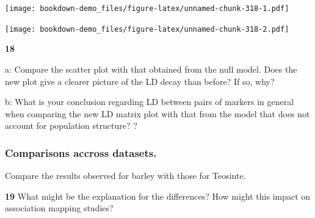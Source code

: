 \documentclass[
]{book}
\makeatletter
\newenvironment{Shaded}{\begin{snugshade}}{\end{snugshade}}
\newcommand{\AttributeTok}[1]{\textcolor[rgb]{0.77,0.63,0.00}{#1}}
\newcommand{\DecValTok}[1]{\textcolor[rgb]{0.00,0.00,0.81}{#1}}
\newcommand{\FloatTok}[1]{\textcolor[rgb]{0.00,0.00,0.81}{#1}}
\newcommand{\FunctionTok}[1]{\textcolor[rgb]{0.00,0.00,0.00}{#1}}
\newcommand{\NormalTok}[1]{#1}
\newcommand{\OtherTok}[1]{\textcolor[rgb]{0.56,0.35,0.01}{#1}}
\newcommand{\SpecialCharTok}[1]{\textcolor[rgb]{0.00,0.00,0.00}{#1}}
\newcommand{\StringTok}[1]{\textcolor[rgb]{0.31,0.60,0.02}{#1}}
\newenvironment{kframe}{%
\medskip{}
\setlength{\fboxsep}{.8em}
 \def\at@end@of@kframe{}%
 \ifinner\ifhmode%
  \def\at@end@of@kframe{\end{minipage}}%
  \begin{minipage}{\columnwidth}%
 \fi\fi%
 \def\FrameCommand##1{\hskip\@totalleftmargin \hskip-\fboxsep
 \colorbox{shadecolor}{##1}\hskip-\fboxsep
     \hskip-\linewidth \hskip-\@totalleftmargin \hskip\columnwidth}%
 \MakeFramed {\advance\hsize-\width
   \@totalleftmargin\z@ \linewidth\hsize
   \@setminipage}}%
 {\par\unskip\endMakeFramed%
 \at@end@of@kframe}
\newenvironment{rmdblock}[1]
  {
  \begin{itemize}
  \renewcommand{\labelitemi}{
    \raisebox{-.7\height}[0pt][0pt]{
      {\setkeys{Gin}{width=3em,keepaspectratio}\texttt{[image: images/\#1]}}
    }
  }
  \setlength{\fboxsep}{1em}
  \begin{kframe}
  \item
  }
  {
  \end{kframe}
  \end{itemize}
  }
\newenvironment{rmdquiz}
  {\begin{rmdblock}{quiz}}
  {\end{rmdblock}}
\makeatother
\begin{document}
\texttt{[image: bookdown-demo\_files/figure-latex/unnamed-chunk-318-1.pdf]}

\begin{Shaded}
\end{Shaded}

\texttt{[image: bookdown-demo\_files/figure-latex/unnamed-chunk-318-2.pdf]}

\begin{rmdquiz}
\textbf{18}

a: Compare the scatter plot with that obtained from the null model. Does the new plot give a clearer picture of the LD decay than before? If so, why?

b: What is your conclusion regarding LD between pairs of markers in general when comparing the new LD matrix plot with that from the model that does not account for population structure? ?
\end{rmdquiz}

\hypertarget{comparisons-accross-datasets.}{%
\subsubsection{Comparisons accross datasets.}\label{comparisons-accross-datasets.}}

Compare the results observed for barley with those for Teosinte.

\begin{rmdquiz}
\textbf{19}
What might be the explanation for the differences? How might this impact on association mapping studies?
\end{rmdquiz}
\end{document}
